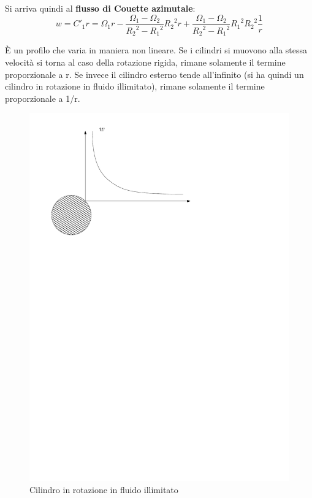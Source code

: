 %			
Si arriva quindi al \textbf{flusso di Couette azimutale}:
%
	\begin{equation*}	
			w = {C'}_1 r = {\Omega}_1 r - \frac{{\Omega}_1 - {\Omega}_2}{{R_2}^2 - {R_1}^2} {R_2}^2 r + \frac{{\Omega}_1 - {\Omega}_2}{{R_2}^2 - {R_1}^2} {R_1}^2 {R_2}^2 \frac{1}{r}
	\end{equation*}
%

È un profilo che varia in maniera non lineare.
Se i cilindri si muovono alla stessa velocità si torna al caso della rotazione rigida, rimane solamente il termine proporzionale a r.
Se invece il cilindro esterno tende all'infinito (si ha quindi un cilindro in rotazione in fluido illimitato), rimane solamente il termine proporzionale a 1/r.
	\begin{figure}[ht]
		\includegraphics[scale=0.7]{./3.6 Soluzioni esatte equazioni di Navier-Stokes/3.6-6}
		\centering
		\caption{Cilindro in rotazione in fluido illimitato}
	\end{figure}
%

